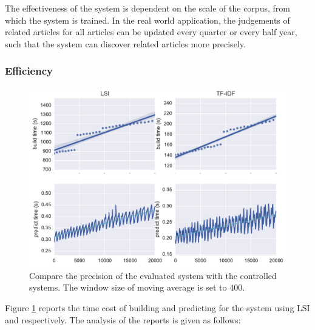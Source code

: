 The effectiveness of the system is dependent on the scale of the corpus, from which the system is trained. In the real world application, the judgements of related articles for all articles can be updated every quarter or every half year, such that the system can discover related articles more precisely. 


\subsubsection{Efficiency}

\begin{figure}[!htb]
    \centering
    \includegraphics[width=\textwidth]{fig/runtime_inc}
    \caption{Compare the precision of the evaluated system with the controlled systems. The window size of moving average is set to $400$.}
    \label{fig:runtime_inc}
\end{figure}

Figure \ref{fig:runtime_inc} reports the time cost of building and predicting for the system using LSI and \tfidf{} respectively. The analysis of the reports is given as follows:

